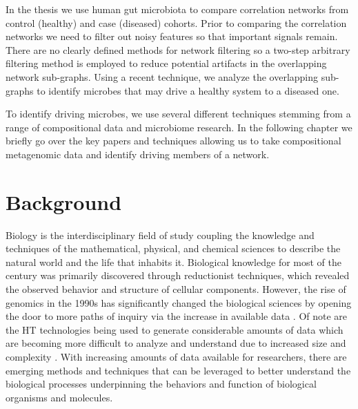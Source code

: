 In the thesis we use human gut microbiota to compare correlation networks from control (healthy) and case (diseased) cohorts. Prior to comparing the correlation networks we need to filter out noisy features so that important signals remain. There are no clearly defined methods for network filtering so a two-step arbitrary filtering method is employed to reduce potential artifacts in the overlapping network sub-graphs. Using a recent technique, we analyze the overlapping sub-graphs to identify microbes that may drive a healthy system to a diseased one.

To identify driving microbes, we use several different techniques stemming from a range of compositional data and microbiome research. In the following chapter we briefly go over the key papers and techniques allowing us to take compositional metagenomic data and identify driving members of a network.



\section{Background}\label{intro-background}

Biology is the interdisciplinary field of study coupling the knowledge and techniques of the mathematical, physical, and chemical sciences to describe the natural world and the life that inhabits it. Biological knowledge for most of the  century was primarily discovered through reductionist techniques, which revealed the observed behavior and structure of cellular components. However, the rise of genomics in the 1990s has significantly changed the biological sciences by opening the door to more paths of inquiry via the increase in available data \citep{Palsson2000}. Of note are the \acrfull{HT} technologies being used to generate considerable amounts of data which are becoming more difficult to analyze and understand due to increased size and complexity \citep{Sboner2011}. With increasing amounts of data available for researchers, there are emerging methods and techniques that can be leveraged to better understand the biological processes underpinning the behaviors and function of biological organisms and molecules.

